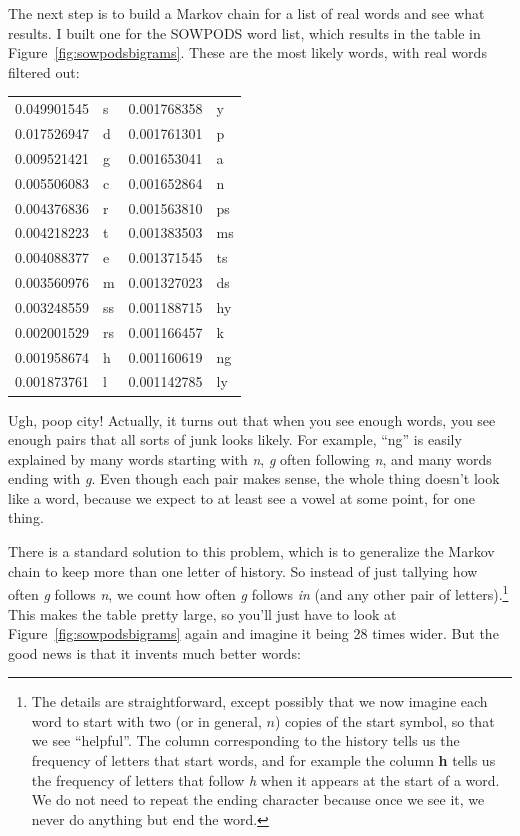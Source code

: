 \documentclass[twocolumn]{article}
\begin{document}
The next step is to build a Markov chain for a list of real words and
see what results. I built one for the SOWPODS word list, which results
in the table in Figure~\ref{fig:sowpodsbigrams}. These
are the most likely words, with real words filtered out:

\begin{center}
\begin{tabular}{rl@{\quad\quad}rl}
0.049901545  & s     &   0.001768358  & y   \\
0.017526947  & d     &   0.001761301  & p   \\
0.009521421  & g     &   0.001653041  & a   \\
0.005506083  & c     &   0.001652864  & n   \\
0.004376836  & r     &   0.001563810  & ps  \\
0.004218223  & t     &   0.001383503  & ms  \\
0.004088377  & e     &   0.001371545  & ts  \\
0.003560976  & m     &   0.001327023  & ds  \\
0.003248559  & ss    &   0.001188715  & hy  \\
0.002001529  & rs    &   0.001166457  & k   \\
0.001958674  & h     &   0.001160619  & ng  \\
0.001873761  & l     &   0.001142785  & ly  \\
\end{tabular}
\end{center}


Ugh, poop city! Actually, it turns out that when you see enough words,
you see enough pairs that all sorts of junk looks likely. For example,
``ng'' is easily explained by many words starting with {\it n}, {\it
g} often following {\it n}, and many words ending with {\it g}. Even
though each pair makes sense, the whole thing doesn't look like a word,
because we expect to at least see a vowel at some point, for one thing.

There is a standard solution to this problem, which is to generalize
the Markov chain to keep more than one letter of history. So instead
of just tallying how often {\it g} follows {\it n}, we count how often
{\it g} follows {\it in} (and any other pair of letters).\!\footnote{
  The details are straightforward, except possibly that we now imagine
  each word to start with two (or in general, $n$) copies of the start
  symbol, so that we see ``\<\<helpful\>''. The column corresponding
  to the history {\bf \<\<} tells us the frequency of letters that
  start words, and for example the column {\bf \<h} tells us the
  frequency of letters that follow {\it h} when it appears at the
  start of a word. We do not need to repeat the ending character \>
  because once we see it, we never do anything but end the word.} This
makes the table pretty large, so you'll just have to look at
Figure~\ref{fig:sowpodsbigrams} again and imagine it being 28 times
wider. But the good news is that it invents much better words:
\end{document}

